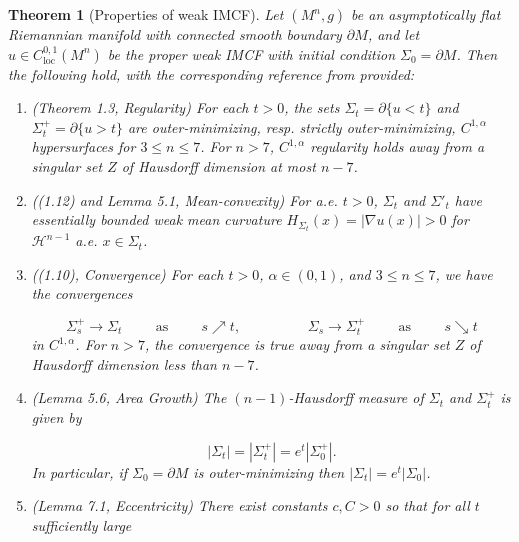 \documentclass[12pt]{amsart}
\newtheorem{theorem}{Theorem}[section]
\theoremstyle{definition}
\numberwithin{equation}{section}
\begin{document}
\begin{theorem}[Properties of weak IMCF] \label{properties}
Let $(M^{n},g)$ be an asymptotically flat Riemannian manifold with connected smooth boundary $\partial M$, and let $u \in C^{0,1}_{\text{loc}}(M^{n})$ be the proper weak IMCF with initial condition $\Sigma_{0}=\partial M$. Then the following hold, with the corresponding reference from \cite{HI99} provided:

\begin{enumerate}[label= (\roman*)]
    \item (Theorem 1.3, Regularity) For each $t >0$, the sets $\Sigma_{t}= \partial \{ u < t \}$ and $\Sigma^{+}_{t}=\partial \{ u > t \}$ are outer-minimizing, resp. strictly outer-minimizing, $C^{1,\alpha}$ hypersurfaces for $3 \leq n \leq 7$. For $n > 7$, $C^{1,\alpha}$ regularity holds away from a singular set $Z$ of Hausdorff dimension at most $n-7$.
    \item ((1.12) and Lemma 5.1, Mean-convexity) For a.e. $t >0$, $\Sigma_{t}$ and $\Sigma'_{t}$ have essentially bounded weak mean curvature $H_{\Sigma_{t}} (x) = |\nabla u(x)| >0$ for $\mathcal{H}^{n-1}$ a.e. $x \in \Sigma_{t}$.
    \item ((1.10), Convergence) For each $t>0$, $\alpha \in (0,1)$, and $3 \leq n \leq 7$, we have the convergences

    \begin{equation} \label{convergence}
        \Sigma^{+}_{s} \rightarrow \Sigma_{t} \hspace{1cm} \text{as} \hspace{1cm} s \nearrow t, \hspace{2cm} \Sigma_{s} \rightarrow \Sigma^{+}_{t} \hspace{1cm} \text{as} \hspace{1cm} s \searrow t
    \end{equation}
    in $C^{1,\alpha}$. For $n > 7$, the convergence is true away from a singular set $Z$ of Hausdorff dimension less than $n-7$.

    \item (Lemma 5.6, Area Growth) The $(n-1)$-Hausdorff measure of $\Sigma_{t}$ and $\Sigma^{+}_{t}$ is given by

    \begin{equation} \label{area_growth}
        |\Sigma_{t}| = |\Sigma^{+}_{t}|= e^{t}|\Sigma^{+}_{0}|.
    \end{equation}
    In particular, if $\Sigma_{0}=\partial M$ is outer-minimizing then $|\Sigma_{t}| = e^{t} |\Sigma_{0}|$.
    \item (Lemma 7.1, Eccentricity) There exist constants $c,C>0$ so that for all $t$ sufficiently large


\end{enumerate}
\end{theorem}
\end{document}
